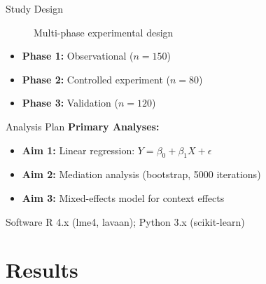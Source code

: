 \documentclass[aspectratio=169,11pt]{beamer}
\begin{document}
\begin{frame}{Study Design}
  \begin{figure}
    \centering
    \caption{Multi-phase experimental design}
  \end{figure}
  \begin{itemize}
    \item \textbf{Phase 1:} Observational ($n = 150$)
    \item \textbf{Phase 2:} Controlled experiment ($n = 80$)
    \item \textbf{Phase 3:} Validation ($n = 120$)
  \end{itemize}
\end{frame}

\begin{frame}{Analysis Plan}
  \textbf{Primary Analyses:}
  \begin{itemize}
    \item \textbf{Aim 1:} Linear regression: $Y = \beta_0 + \beta_1 X + \epsilon$
    \item \textbf{Aim 2:} Mediation analysis (bootstrap, 5000 iterations)
    \item \textbf{Aim 3:} Mixed-effects model for context effects
  \end{itemize}
  \vspace{0.5cm}
  \begin{block}{Software}
    R 4.x (lme4, lavaan); Python 3.x (scikit-learn)
  \end{block}
\end{frame}

\section{Results}
\end{document}
